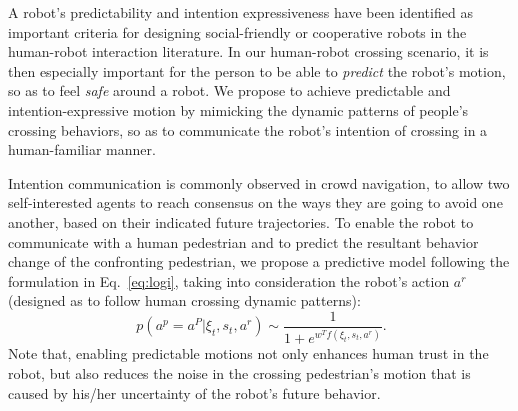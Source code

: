 \documentclass[conference]{IEEEtran}
\begin{document}

A robot's predictability and intention expressiveness have been identified
as important criteria for designing social-friendly or cooperative robots in 
the human-robot interaction literature. In our human-robot crossing scenario, 
it is then especially important for the person to be able to \textit{predict} 
the robot's motion, so as to feel \textit{safe} around a robot.
We  propose to achieve predictable and 
intention-expressive motion by mimicking the dynamic patterns of people's
crossing behaviors, so as to communicate
the robot's intention of crossing in a human-familiar manner.


Intention communication is commonly observed in crowd navigation, to allow two 
self-interested agents to reach 
consensus on the ways they are going to avoid one another, based on their 
indicated future trajectories. To enable the robot
to communicate with a human pedestrian and to predict the resultant behavior change of 
the confronting pedestrian, we propose a predictive model 
following the formulation in 
Eq.~\ref{eq:logi}, taking into consideration the robot's action $a^r$ (designed as 
to follow human crossing dynamic patterns):
\begin{equation}~\label{eq:transition}
p(a^p=a^P|\xi_t, s_t, a^r) \sim \frac{1}{1+e^{w^Tf(\xi_t,s_t,a^r)}}.
\end{equation}
Note that, enabling predictable motions not only enhances human trust in the 
robot, but also reduces the noise in the crossing pedestrian's motion that is 
caused by his/her uncertainty of the robot's future behavior.
\end{document}
